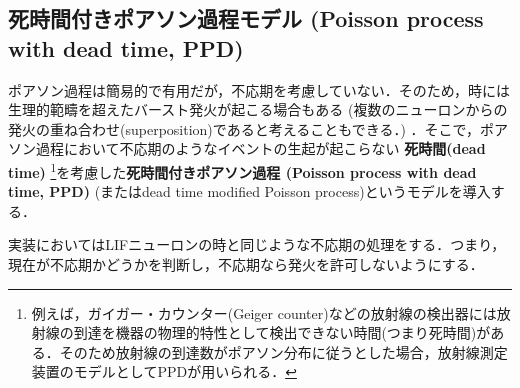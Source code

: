 \subsection{死時間付きポアソン過程モデル (Poisson process with dead time, PPD)}
ポアソン過程は簡易的で有用だが，不応期を考慮していない．そのため，時には生理的範疇を超えたバースト発火が起こる場合もある (複数のニューロンからの発火の重ね合わせ(superposition)であると考えることもできる．) ．そこで，ポアソン過程において不応期のようなイベントの生起が起こらない \textbf{死時間(dead time)} \footnote{例えば，ガイガー・カウンター(Geiger counter)などの放射線の検出器には放射線の到達を機器の物理的特性として検出できない時間(つまり死時間)がある．そのため放射線の到達数がポアソン分布に従うとした場合，放射線測定装置のモデルとしてPPDが用いられる．}を考慮した\textbf{死時間付きポアソン過程 (Poisson process with dead time, PPD)} (またはdead time modified Poisson process)というモデルを導入する．

実装においてはLIFニューロンの時と同じような不応期の処理をする．つまり，現在が不応期かどうかを判断し，不応期なら発火を許可しないようにする．
